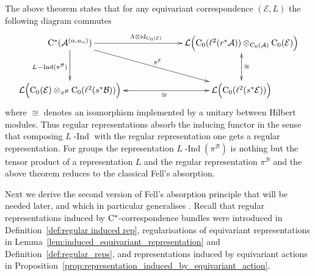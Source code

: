 \documentclass[11 pt, leqno]{amsart}
\numberwithin{equation}{section}
\theoremstyle{plain}
\theoremstyle{definition}
\newcommand*{\Cst}{\mathrm \cst}%
\newcommand*{\congto}{\xrightarrow\sim}
\newcommand*{\contz}{\mathrm{C_0}}%
\DeclareMathOperator{\dashind}{-Ind}
\newcommand{\B}{\mathcal B}
\newcommand{\LL}{\mathcal L}
\newcommand{\EE}{\mathcal E}
\newcommand{\A}{\mathcal A}
\newcommand{\cst}{\ifmmode\mathrm{C}^*\else{$\mathrm{C}^*$}\fi}
\newcommand*{\bcomment}[1]{{\color{blue}#1}}
\begin{document}
The above theorem states that for any equivariant correspondence $(\EE, L)$ the following diagram commutes
\[
\xymatrixcolsep{2.6pc} \xymatrixrowsep{2.6pc}
\xymatrix{ 
        \Cst( \A^{(\alpha,u_{\alpha})} )	 \ar@{->}[d]_{\text{\normalsize $L\dashind(\pi^\B)$}} \ar@{->}[rrd]^{\pi^\EE} \ar@{->}[rr]^{\Lambda\otimes \mathrm{id}_{\contz(\EE)\qquad\,\,} } 
        &  & \LL\Big(\contz(\ell^2(r^*\A)) \otimes_{\contz(\A)} \contz(\EE) \Big)  \ar@{<->}[d]^{\cong}
            \\
        \LL\Big( \contz(\EE)\otimes_{\pi^{\B}} \contz(\ell^2(s^*\B))\Big) \ar@{<->}[rr]_{\qquad \cong}%
        & & \LL\Big( \contz(\ell^2(s^*\EE))\Big)
}
\]
where $\cong$ denotes an isomorphism implemented by a unitary between Hilbert modules. 
Thus regular representations absorb the inducing functor in the sense that composing $L\dashind$ with the regular representation one gets a  regular representation. 
For groups the representation $L\dashind(\pi^{\B})$ is nothing but the tensor product of a representation $L$ and the regular representation $\pi^{\B}$ and the above theorem reduces to the classical Fell's absorption.


Next we derive the second version of Fell's absorption principle that will be needed later, and which in particular generalises \cite[Theorem 4.11]{BedosContiregular}. Recall that regular representations induced by $\cst$-correspondence bundles were introduced in Definition~\ref{def:regular induced rep}, regularisations of equivariant representations in Lemma~\ref{lem:induced_equivariant_representation} and Definition~\ref{def:regular_reps}, and representations induced by equivariant actions in Proposition~\ref{prop:representation_induced_by_equivariant_action}.
\end{document}
